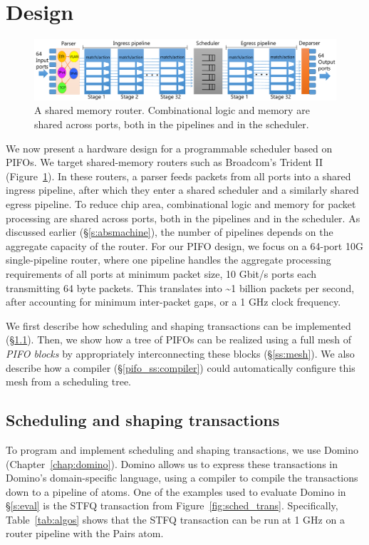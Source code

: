\section{Design}
\label{s:design}

\begin{figure}
  \centering
  \includegraphics[width=\textwidth]{pifo_router_pipeline.pdf}
  \caption{A shared memory router.  Combinational logic and memory are
  shared across ports, both in the pipelines and in the scheduler.}
  \label{pifo_fig:router}
\end{figure}

We now present a hardware design for a programmable scheduler based on PIFOs.
We target shared-memory routers such as Broadcom's Trident II~\cite{trident2}
(Figure~\ref{pifo_fig:router}). In these routers, a parser feeds packets from
all ports into a shared ingress pipeline, after which they enter a shared
scheduler and a similarly shared egress pipeline. To reduce chip area,
combinational logic and memory for packet processing are shared across ports,
both in the pipelines and in the scheduler. As discussed earlier
(\S\ref{s:absmachine}), the number of pipelines depends on the aggregate
capacity of the router. For our PIFO design, we focus on a 64-port 10G
single-pipeline router, where one pipeline handles the aggregate processing
requirements of all ports at minimum packet size,  10 Gbit/s ports each
transmitting 64 byte packets. This translates into \textasciitilde 1 billion
packets per second, after accounting for minimum inter-packet gaps, or a 1 GHz
clock frequency.

We first describe how scheduling and shaping transactions can be implemented
(\S\ref{ss:transactions}). Then, we show how a tree of PIFOs can be realized
using a full mesh of {\em PIFO blocks} by appropriately interconnecting these blocks
(\S\ref{ss:mesh}). We also describe how a compiler (\S\ref{pifo_ss:compiler}) could
automatically configure this mesh from a scheduling tree.

\subsection{Scheduling and shaping transactions}
\label{ss:transactions}
To program and implement scheduling and shaping transactions, we use Domino
(Chapter~\ref{chap:domino}). Domino allows us to express these transactions in
Domino's domain-specific language, using a compiler to compile the transactions
down to a pipeline of \absmachine atoms.  One of the examples used to evaluate
Domino in \S\ref{s:eval} is the STFQ transaction from
Figure~\ref{fig:sched_trans}.  Specifically, Table~\ref{tab:algos} shows that
the STFQ transaction can be run at 1 GHz on a router pipeline with the Pairs
atom.

